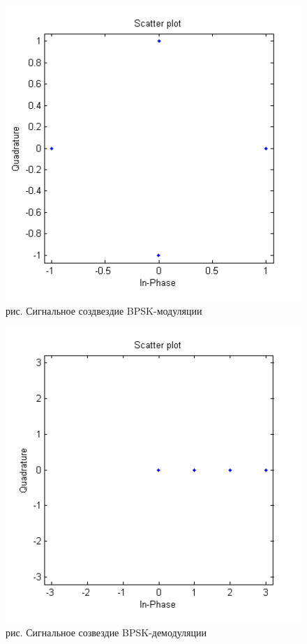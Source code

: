 \documentclass[10pt,a4paper]{report}
\begin{document}
\begin{figure}
\begin{center}
\includegraphics[width=150mm, scale = 0.9]{9_1}\newline
рис. Сигнальное создвездие BPSK-модуляции\newline
\end{center}
\end{figure}
\begin{figure}
\begin{center}
\includegraphics[width=150mm, scale = 0.9]{9_2}\newline
рис. Сигнальное созвездие BPSK-демодуляции\newline
\end{center}
\end{figure}
\end{document}
